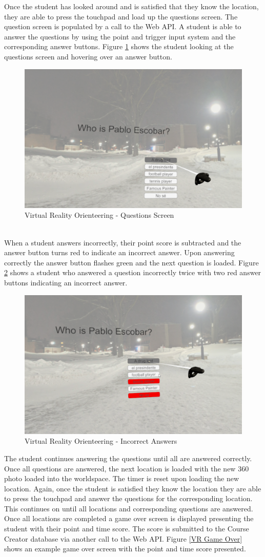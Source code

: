 Once the student has looked around and is satisfied that they know the location, they are able to press the touchpad and load up the questions screen. The question screen is populated by a call to the Web API. A student is able to answer the questions by using the point and trigger input system and the corresponding answer buttons. Figure \ref{VR Question} shows the student looking at the questions screen and hovering over an answer button. 
\begin{figure}[htb]
	\centering
	\includegraphics[width=.6\textwidth]{Requirements/assets/vr-view-questions.png}
	\caption[Virtual Reality Orienteering - Questions Screen]{\label{VR Question}Virtual Reality Orienteering - Questions Screen}
\end{figure}
\\
When a student answers incorrectly, their point score is subtracted and the answer button turns red to indicate an incorrect answer. Upon answering correctly the answer button flashes green and the next question is loaded. Figure \ref{VR Incorrect Answers} shows a student who answered a question incorrectly twice with two red answer buttons indicating an incorrect answer.
\begin{figure}[htb]
	\centering
	\includegraphics[width=.6\textwidth]{Requirements/assets/vr-answer-incorrectly.png}
	\caption[Virtual Reality Orienteering - Incorrect Answers]{\label{VR Incorrect Answers}Virtual Reality Orienteering - Incorrect Answers}
\end{figure} \clearpage
The student continues answering the questions until all are answered correctly. Once all questions are answered, the next location is loaded with the new 360 photo loaded into the worldspace. The timer is reset upon loading the new location. Again, once the student is satisfied they know the location they are able to press the touchpad and answer the questions for the corresponding location. This continues on until all locations and corresponding questions are answered. Once all locations are completed a game over screen is displayed presenting the student with their point and time score. The score is submitted to the Course Creator database via another call to the Web API. Figure \ref{VR Game Over} shows an example game over screen with the point and time score presented. 
